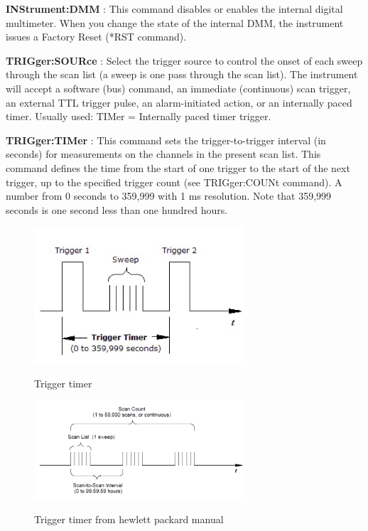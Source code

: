 \documentclass[a4paper]{article}
\begin{document}
\textbf{INStrument:DMM} : This command disables or enables the internal digital multimeter. When you change the state of the internal DMM, the instrument issues a Factory Reset (*RST command).

\textbf{TRIGger:SOURce} : Select the trigger source to control the onset of each sweep through the scan list (a sweep is one pass through the scan list). The instrument will accept a software (bus) command, an immediate (continuous) scan trigger, an external TTL trigger pulse, an alarm-initiated action, or an internally paced timer. Usually used: TIMer = Internally paced timer trigger.

\textbf{TRIGger:TIMer} : This command sets the trigger-to-trigger interval (in seconds) for measurements on the channels in the present scan list. This command defines the time from the start of one trigger to the start of the next trigger, up to the specified trigger count (see TRIGger:COUNt command). A number from 0 seconds to 359,999 with 1 ms resolution. Note that 359,999 seconds is one second less than one hundred hours.


\begin{figure}[h!]
	\centering
	\includegraphics[width=0.7\textwidth]{trigger_timer.png}
	\label{fig:trigger_timer}
	\caption{Trigger timer}
\end{figure}

\begin{figure}[h!]
	\centering
	\includegraphics[width=0.7\textwidth]{trigger_timer2.png}
	\label{fig:trigger_timer2}
	\caption{Trigger timer from hewlett packard manual}
\end{figure}
\end{document}
